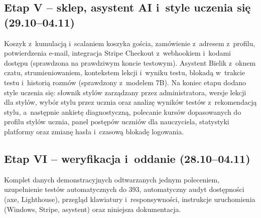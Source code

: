 \subsection*{Etap V -- sklep, asystent AI i~style uczenia się (29.10--04.11)}
Koszyk z~kumulacją i~scalaniem koszyka gościa, zamówienie z~adresem z~profilu,
potwierdzenia e-mail, integracja Stripe Checkout z~webhookiem i~kodami dostępu (sprawdzona
na prawdziwym koncie testowym). Asystent Bielik z~oknem czatu, strumieniowaniem,
kontekstem lekcji i~wyniku testu, blokadą w~trakcie testu i~historią rozmów (sprawdzony
z~modelem 7B). Na koniec etapu dodano style uczenia się: słownik stylów zarządzany przez
administratora, wersje lekcji dla stylów, wybór stylu przez ucznia oraz analizę wyników testów
z~rekomendacją stylu, a~następnie ankietę diagnostyczną, polecanie kursów dopasowanych do profilu
stylów ucznia, panel postępów uczniów dla nauczyciela, statystyki platformy oraz zmianę hasła
i~czasową blokadę logowania.

\subsection*{Etap VI -- weryfikacja i~oddanie (28.10--04.11)}
Komplet danych demonstracyjnych odtwarzanych jednym poleceniem, uzupełnienie testów
automatycznych do 393, automatyczny audyt dostępności (axe, Lighthouse), przegląd klawiatury i~responsywności, instrukcje uruchomienia
(Windows, Stripe, asystent) oraz niniejsza dokumentacja.
